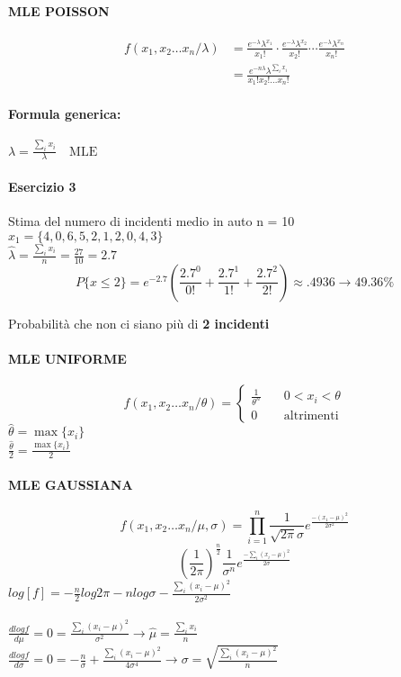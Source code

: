 \documentclass[]{article}
\newcommand{\formula}{\paragraph{Formula generica:}}
\begin{document}
    \paragraph{MLE POISSON}
    \begin{equation*}
        \begin{split}
            f(x_1, x_2 \ldots x_n / \lambda) &= \frac{e^{-\lambda} \lambda^{x_1}}{x_1 !} \cdot \frac{e^{-\lambda} \lambda^{x_2}}{x_2 !} \cdots \frac{e^{-\lambda} \lambda^{x_n}}{x_n !} \\
            &= \frac{e^{-n\lambda} \lambda^{\sum_{i}^{} x_i}}{x_1! x_2! \ldots x_n!}
        \end{split}
    \end{equation*}
    \formula
    $\lambda = \frac{\sum_{i}^{} x_i}{\lambda} \quad \text{MLE} $
    \paragraph{Esercizio 3} Stima del numero di incidenti medio in auto n = 10 \\
    $x_1 = \{ 4,0,6,5,2,1,2,0,4,3 \}$ \\
    $\hat{\lambda} = \frac{\sum_{i}^{} x_i}{n} = \frac{27}{10} = 2.7$
    \[ P\{x \leq 2 \} = e^{-2.7} (\frac{2.7^0}{0!} + \frac{2.7^1}{1!} + \frac{2.7^2}{2!}) \approx .4936 \rightarrow 49.36\% \]
    \centerline{Probabilità che non ci siano più di \textbf{2 incidenti} }
    \paragraph{MLE UNIFORME}
    \begin{equation*}
        f(x_1, x_2 \ldots x_n / \theta) =
        \begin{cases}
                \frac{1}{\theta^n} & \quad 0 < x_i < \theta \\
                0 & \quad \text{altrimenti}
        \end{cases}
    \end{equation*}
    $\hat{\theta} = \max\{x_i\}$ \\
    $\frac{\hat{\theta}}{2} = \frac{\max\{ x_i\}}{2}$
    \paragraph{MLE GAUSSIANA}
    \[ f(x_1,x_2 \ldots x_n / \mu, \sigma) = \prod_{i=1}^{n} \frac{1}{\sqrt{2\pi} \sigma} e^{\frac{-(x_1 - \mu)^2}{2 \sigma^2}} \]
    \[ (\frac{1}{2 \pi})^{\frac{n}{2}} \frac{1}{\sigma^n} e^{\frac{-\sum_{i}^{}(x_i - \mu)^2}{2 \sigma}} \]
    $log[f] = - \frac{n}{2} log 2\pi - n log \sigma - \frac{\sum_{i}^{}(x_i - \mu)^2}{2\sigma^2}$ \\ \\
    $\frac{d log f}{d \mu} = 0 = \frac{\sum_{i}^{}(x_i - \mu)^2}{\sigma^2} \longrightarrow \hat{\mu} = \frac{\sum_{i}^{}x_i}{n}$ \\
    $\frac{d log f}{d \sigma} = 0 = - \frac{n}{\sigma} + \frac{\sum_{i}^{} (x_i - \mu)^2}{4 \sigma^4} \rightarrow \sigma = \sqrt{\frac{\sum_{i}^{}(x_i - \mu)^2}{n}}$
\end{document}
